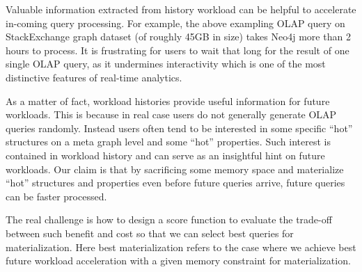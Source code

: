 Valuable information extracted from history workload can be helpful to accelerate in-coming query processing. For example, the above exampling OLAP query on StackExchange graph dataset (of roughly 45GB in size) takes Neo4j more than 2 hours to process. It is frustrating for users to wait that long for the result of one single OLAP query, as it undermines interactivity which is one of the most distinctive features of real-time analytics. %

As a matter of fact, workload histories provide useful information for future workloads. This is because in real case users do not generally generate OLAP queries randomly. Instead users often tend to be interested in some specific ``hot'' structures on a meta graph level and some ``hot'' properties. Such interest is contained in workload history and can serve as an insightful hint on future workloads. Our claim is that by sacrificing some memory space and materialize ``hot'' structures and properties even before future queries arrive, future queries can be faster processed.



The real challenge is how to design a score function to evaluate the trade-off  between such benefit and cost so that we can select best queries for materialization. Here best materialization refers to the case where we achieve best future workload acceleration with a given memory constraint for materialization.





